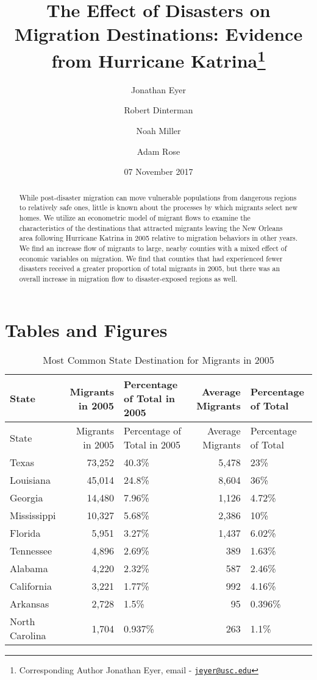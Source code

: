 \documentclass[]{article}
\title{The Effect of Disasters on Migration Destinations: Evidence from
Hurricane Katrina\thanks{Corresponding Author Jonathan Eyer, email -
\href{mailto:jeyer@usc.edu}{\nolinkurl{jeyer@usc.edu}}}}
\author[1]{Jonathan Eyer}
\author[2]{Robert Dinterman}
\author[1]{Noah Miller}
\author[1]{Adam Rose}
\affil[1]{University of Southern California}
\affil[2]{The Ohio State University}
\date{07 November 2017}
\begin{document}
\maketitle

\begin{abstract}
\noindent While post-disaster migration can move vulnerable populations from
dangerous regions to relatively safe ones, little is known about the
processes by which migrants select new homes. We utilize an econometric
model of migrant flows to examine the characteristics of the
destinations that attracted migrants leaving the New Orleans area
following Hurricane Katrina in 2005 relative to migration behaviors in
other years. We find an increase flow of migrants to large, nearby
counties with a mixed effect of economic variables on migration. We find
that counties that had experienced fewer disasters received a greater
proportion of total migrants in 2005, but there was an overall increase
in migration flow to disaster-exposed regions as well.
\vspace{.5cm}

\end{abstract}
\newpage

\section{Tables and Figures}\label{tables-and-figures}

\begin{longtable}[]{@{}lrlrl@{}}
\caption{Most Common State Destination for Migrants in 2005
\label{tab:commondeststate}}\tabularnewline
\toprule
State & Migrants in 2005 & Percentage of Total in 2005 & Average
Migrants & Percentage of Total\tabularnewline
\midrule
\endfirsthead
\toprule
State & Migrants in 2005 & Percentage of Total in 2005 & Average
Migrants & Percentage of Total\tabularnewline
\midrule
\endhead
Texas & 73,252 & 40.3\% & 5,478 & 23\%\tabularnewline
Louisiana & 45,014 & 24.8\% & 8,604 & 36\%\tabularnewline
Georgia & 14,480 & 7.96\% & 1,126 & 4.72\%\tabularnewline
Mississippi & 10,327 & 5.68\% & 2,386 & 10\%\tabularnewline
Florida & 5,951 & 3.27\% & 1,437 & 6.02\%\tabularnewline
Tennessee & 4,896 & 2.69\% & 389 & 1.63\%\tabularnewline
Alabama & 4,220 & 2.32\% & 587 & 2.46\%\tabularnewline
California & 3,221 & 1.77\% & 992 & 4.16\%\tabularnewline
Arkansas & 2,728 & 1.5\% & 95 & 0.396\%\tabularnewline
North Carolina & 1,704 & 0.937\% & 263 & 1.1\%\tabularnewline
\bottomrule
\end{longtable}
\end{document}
